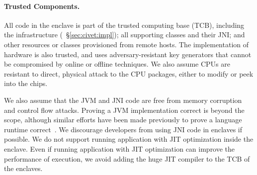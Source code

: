 

\paragraph{Trusted Components.}
All code in the enclave is part of the trusted computing base (TCB),
including the \sysname{} infrastructure 
(~\S\ref{sec:civet:impl}); %
all supporting classes and their JNI;
and other resources or classes provisioned from remote hosts.
The implementation of \sgx{} hardware is also trusted,
and uses adversary-resistant key generators that cannot be compromised
by online or offline techniques.
We also assume \intel{} CPUs are resistant to direct, physical attack to the CPU packages, either to modify or peek into the chips.

We also assume that the JVM and JNI code are free from memory corruption and control flow attacks.
Proving a JVM implementation correct is beyond the scope, although similar 
efforts have been made previously to prove a language runtime correct~\citep{yang10safe}.
We discourage developers from using JNI code in enclaves if possible.
We do not support running \java{} application with JIT optimization
inside the enclave.
Even if running \java{} application with JIT optimization
can improve the performance of execution,
we avoid adding the huge JIT compiler to the TCB of the enclaves.


